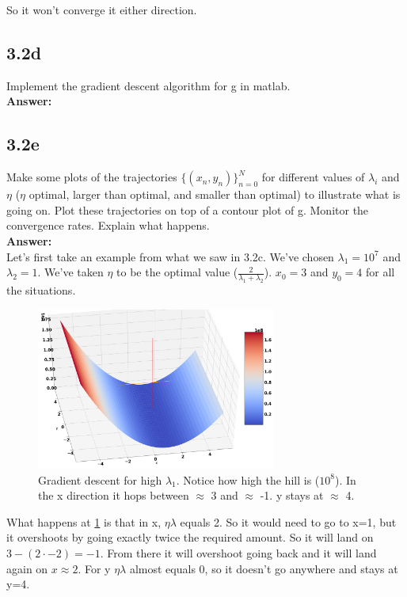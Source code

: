 \documentclass[a4paper]{article}
\begin{document}
So it won't converge it either direction. 

\subsection*{3.2d}

Implement the gradient descent algorithm for g in matlab.\\

\textbf{Answer:}\\


\subsection*{3.2e}

Make some plots of the trajectories $\{(x_n,y_n)\}^N_{n=0}$ for different values of $\lambda_i$ and $\eta$ ($\eta$ optimal, larger than optimal, and smaller than optimal) to illustrate what is going on. Plot these trajectories on top of a contour plot of g. Monitor the convergence rates. Explain what happens.\\

\textbf{Answer:}\\

Let's first take an example from what we saw in 3.2c. We've chosen $\lambda_1 = 10^7$ and $\lambda_2 = 1$. We've taken $\eta$ to be the optimal value ($\frac{2}{\lambda_1 + \lambda_2}$). $x_0 = 3$ and $y_0 = 4$ for all the situations.


\begin{figure}[H]
\includegraphics[width=0.7\textwidth]{Images/HighLamb.png}
\caption{Gradient descent for high $\lambda_1$. Notice how high the hill is ($10^8$). In the x direction it hops between $\approx$ 3 and $\approx$ -1. y stays at $\approx$ 4.}
\label{mountain}
\end{figure}

What happens at \ref{mountain} is that in x, $\eta \lambda$ equals 2. So it would need to go to x=1, but it overshoots by going exactly twice the required amount. So it will land on $3 - (2\cdot -2) = -1$.
From there it will overshoot going back and it will land again on $x\approx 2$. For y $\eta \lambda$ almost equals 0, so it doesn't go anywhere and stays at y=4.
\end{document}
